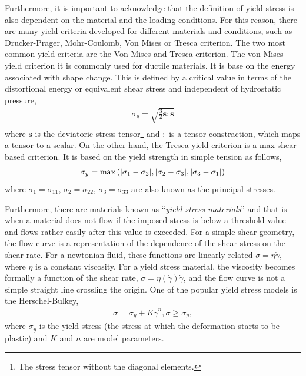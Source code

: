 Furthermore, it is important to acknowledge that the definition of yield stress is also dependent on the material and the loading conditions\citep{bonnYieldStressMaterials2017}.
For this reason, there are many yield criteria developed for different materials and conditions, such as Drucker-Prager, Mohr-Coulomb, Von Mises or Tresca criterion.
The two most common yield criteria are the Von Mises and Tresca criterion.
The von Mises yield criterion it is commonly used for ductile materials.
It is base on the energy associated with shape change. 
This is defined by a critical value in terms of the distortional energy or equivalent shear stress and independent of hydrostatic pressure, 
\begin{gather}
    \sigma_y = \sqrt{\frac{3}{2}\bm{s}:\bm{s}}\label{eqn:vonMisesCriterion}
\end{gather}
where $\bm{s}$ is the deviatoric stress tensor\footnote{The stress tensor without the diagonal elements.} and $:$ is a tensor constraction, which maps a tensor to a scalar.
On the other hand, the Tresca yield criterion is a max-shear based criterion.
It is based on the yield strength in simple tension as follows, 
\begin{gather}
   \sigma_y = \max\left(\abs{\sigma_1-\sigma_2},\abs{\sigma_2-\sigma_3},\abs{\sigma_3-\sigma_1}\right)\label{eqn:trescaCriterion}
\end{gather}
where $\sigma_1=\sigma_{11}$, $\sigma_2=\sigma_{22}$, $\sigma_3=\sigma_{33}$ are also known as the principal stresses.

Furthermore, there are materials known as ``\textit{yield stress materials}'' and that is when a material does not flow if the imposed stress is below a threshold value and flows rather easily after this value is exceeded\citep{bonnYieldStressMaterials2017}.
For a simple shear geometry, the flow curve is a representation of the dependence of the shear stress on the shear rate.
For a newtonian fluid, these functions are linearly related $\sigma=\eta\dot{\gamma}$, where $\eta$ is a constant viscosity.
For a yield stress material, the viscosity becomes formally a function of the shear rate, $\sigma=\eta(\dot{\gamma})\dot{\gamma}$, and the flow curve is not a simple straight line crossling the origin.
One of the popular yield stress models is the Herschel-Bulkey, 
\begin{gather}
    \sigma = \sigma_y + K\dot{\gamma}^{n},\sigma\geq\sigma_y\label{eqn:herschel-bulkey},
\end{gather}
where $\sigma_y$ is the yield stress (the stress at which the deformation starts to be plastic) and $K$ and $n$ are model parameters.

